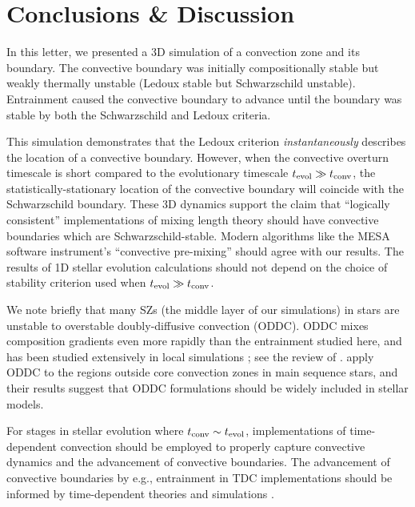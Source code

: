\section{Conclusions \& Discussion}
\label{sec:conclusions}

In this letter, we presented a 3D simulation of a convection zone and its boundary.
The convective boundary was initially compositionally stable but weakly thermally unstable (Ledoux stable but Schwarzschild unstable).
Entrainment caused the convective boundary to advance until the boundary was stable by both the Schwarzschild and Ledoux criteria.

This simulation demonstrates that the Ledoux criterion \emph{instantaneously} describes the location of a convective boundary.
However, when the convective overturn timescale is short compared to the evolutionary timescale $t_{\rm{evol}} \gg t_{\rm{conv}}$, the statistically-stationary location of the convective boundary will coincide with the Schwarzschild boundary.
These 3D dynamics support the claim that ``logically consistent'' implementations of mixing length theory \citep{gabriel_etal_2014, mesa4, mesa5} should have convective boundaries which are Schwarzschild-stable.
Modern algorithms like the MESA software instrument's ``convective pre-mixing'' \citep[CPM,][]{mesa5} should agree with our results.
The results of 1D stellar evolution calculations should not depend on the choice of stability criterion used when $t_{\rm{evol}} \gg t_{\rm{conv}}$.

We note briefly that many SZs (the middle layer of our simulations) in stars are unstable to overstable doubly-diffusive convection (ODDC).
ODDC mixes composition gradients even more rapidly than the entrainment studied here, and has been studied extensively in local simulations \citep{mirouh_etal_2012, wood_etal_2013, xie_etal_2017}; see the review of \citet{garaud_2018}.
\citet{moore_garaud_2016} apply ODDC to the regions outside core convection zones in main sequence stars, and their results suggest that ODDC formulations should be widely included in stellar models.

For stages in stellar evolution where $t_{\rm{conv}} \sim t_{\rm{evol}}$, implementations of time-dependent convection \citep[TDC,][]{tdc_1986} should be employed to properly capture convective dynamics and the advancement of convective boundaries.
The advancement of convective boundaries by e.g., entrainment in TDC implementations should be informed by time-dependent theories and simulations \citep[e.g.,][]{turner_1968, fuentes_cumming_2020}.


